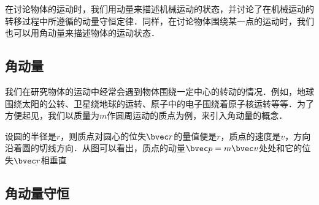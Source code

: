 
\begin{issues}
\issueTODO
\end{issues}

在讨论物体的运动时，我们用动量来描述机械运动的状态，并讨论了在机械运动的转移过程中所遵循的动量守恒定律．同样，在讨论物体围绕某一点的运动时，我们也可以用角动量来描述物体的运动状态．
\subsection{角动量}
我们在研究物体的运动中经常会遇到物体围绕一定中心的转动的情况．例如，地球围绕太阳的公转、卫星绕地球的运转、原子中的电子围绕着原子核运转等等．为了方便起见，我们以质量为$m$作圆周运动的质点为例，来引入角动量的概念．

设圆的半径是$r$，则质点对圆心的位失$\bvec r$的量值便是$r$，质点的速度是$v$，方向沿着圆的切线方向．从图可以看出，质点的动量$\bvec p = m\bvec v$处处和它的位失$\bvec r$相垂直
\subsection{角动量守恒}



